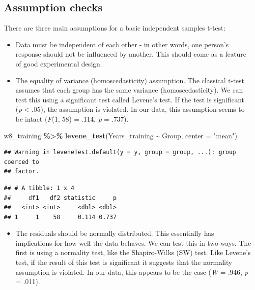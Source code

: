 \documentclass[
]{book}
\newenvironment{Shaded}{\begin{snugshade}}{\end{snugshade}}
\newcommand{\AttributeTok}[1]{\textcolor[rgb]{0.13,0.29,0.53}{#1}}
\newcommand{\FunctionTok}[1]{\textcolor[rgb]{0.13,0.29,0.53}{\textbf{#1}}}
\newcommand{\NormalTok}[1]{#1}
\newcommand{\SpecialCharTok}[1]{\textcolor[rgb]{0.81,0.36,0.00}{\textbf{#1}}}
\newcommand{\StringTok}[1]{\textcolor[rgb]{0.31,0.60,0.02}{#1}}
\providecommand{\tightlist}{%
  \setlength{\itemsep}{0pt}\setlength{\parskip}{0pt}}
\begin{document}
\hypertarget{assumption-checks-1}{%
\subsection{Assumption checks}\label{assumption-checks-1}}

There are three main assumptions for a basic independent samples t-test:

\begin{itemize}
\tightlist
\item
  Data must be independent of each other - in other words, one person's response should not be influenced by another. This should come as a feature of good experimental design.
\item
  The equality of variance (homoscedasticity) assumption. The classical t-test assumes that each group has the same variance (homoscedasticity). We can test this using a significant test called Levene's test. If the test is significant (\emph{p} \textless{} .05), the assumption is violated. In our data, this assumption seems to be intact (\emph{F}(1, 58) = .114, \emph{p} = .737).
\end{itemize}

\begin{Shaded}
\begin{Highlighting}[]
\NormalTok{w8\_training }\SpecialCharTok{\%\textgreater{}\%}
  \FunctionTok{levene\_test}\NormalTok{(Years\_training }\SpecialCharTok{\textasciitilde{}}\NormalTok{ Group, }\AttributeTok{center =} \StringTok{"mean"}\NormalTok{)}
\end{Highlighting}
\end{Shaded}

\begin{verbatim}
## Warning in leveneTest.default(y = y, group = group, ...): group coerced to
## factor.
\end{verbatim}

\begin{verbatim}
## # A tibble: 1 x 4
##     df1   df2 statistic     p
##   <int> <int>     <dbl> <dbl>
## 1     1    58     0.114 0.737
\end{verbatim}

\begin{itemize}
\tightlist
\item
  The residuals should be normally distributed. This essentially has implications for how well the data behaves. We can test this in two ways. The first is using a normality test, like the Shapiro-Wilks (SW) test. Like Levene's test, if the result of this test is significant it suggests that the normality assumption is violated. In our data, this appears to be the case (\emph{W} = .946, \emph{p} = .011).
\end{itemize}
\end{document}
